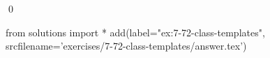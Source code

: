 
\begin{ex}
  \label{ex:7-72-class-templates}
  
  \qed
\end{ex}
\begin{python0}
from solutions import *
add(label="ex:7-72-class-templates",
    srcfilename='exercises/7-72-class-templates/answer.tex')
\end{python0}
